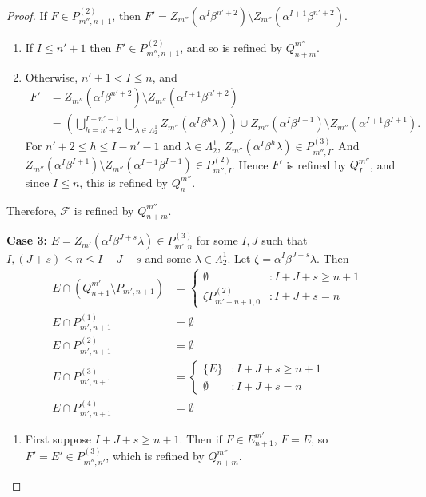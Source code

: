 \documentclass[12pt]{amsart}
\newcommand{\sm}{\setminus}
\newcommand{\mc}[1]{\mathcal{#1}}
\newcommand{\emp}{\emptyset}
\newcommand{\al}{\alpha}
\newcommand{\be}{\beta}
\newcommand{\ze}{\zeta}
\newcommand{\la}{\lambda}
\newcommand{\La}{\Lambda}
\theoremstyle{plain} %
\theoremstyle{definition} %
\begin{document}
\begin{proof}
    If $F \in P^{(2)}_{m'',n+1}$, then $F' = Z_{m''}(\al^I \be^{n'+2}) \sm Z_{m''}(\al^{I+1}\be^{n'+2}).$ 
    \begin{enumerate}
        \item If $I \le n'+1$ then $F' \in P^{(2)}_{m'',n+1}$, and so is refined by $Q_{n+m}^{m''}$.

        \item Otherwise, $n'+1 < I \leq n$, and
        \begin{align*}
            F' &= Z_{m''}(\al^I \be^{n'+2}) \sm Z_{m''}(\al^{I+1}\be^{n'+2})\\
            &= \left( \bigcup_{h=n'+2}^{I-n'-1} \bigcup_{\la \in \La_2^1} Z_{m''}(\al^{I}\be^h \la) \right) \cup Z_{m''}(\al^I \be^{I+1}) \sm Z_{m''}(\al^{I+1} \be^{I+1}).
        \end{align*}
        For $n'+2 \leq h \leq I-n' -1$ and $\la \in \La_2^1$, $Z_{m''}(\al^I\be^h \la) \in P_{m'',I}^{(3)}$. And $Z_{m''}(\al^I \be^{I+1}) \sm Z_{m''}(\al^{I+1} \be^{I+1}) \in P_{m'', I}^{(2)}$. Hence $F'$ is refined by $Q_I^{m''}$, and since $I \le n$, this is refined by $Q_n^{m''}$.
    \end{enumerate}
    Therefore, $\mc{F}$ is refined by $Q_{n+m}^{m''}$.


    \textbf{Case 3:} $E = Z_{m'}(\al^{I}\be^{J+s} \la) \in P_{m',n}^{(3)}$ for some $I, J$ such that $I, (J+s) \leq n \leq I+J+s$ and some $\la \in \La_2^1$. Let $\ze=\al^I \be^{J+s} \la$. Then
    \begin{align*}
        E \cap (Q^{m'}_{n+1} \sm P_{m', n+1}) &= \begin{cases}
            \emp &: I+J+s \geq n+1\\
            \ze P_{m'+n+1,0}^{(2)} &: I+J+s = n
        \end{cases}\\
        E \cap P^{(1)}_{m',n+1} &= \emp\\
        E \cap P^{(2)}_{m',n+1} &= \emp\\
        E \cap P^{(3)}_{m',n+1} &= \begin{cases}
            \{E\} &: I+J+s \geq n+1\\ \emp &: I+J+s = n
        \end{cases}\\
        E \cap P^{(4)}_{m',n+1} &= \emp
    \end{align*}
    \begin{enumerate}
        \item First suppose $I+J+s \ge n+1$. Then if $F \in E_{n+1}^{m'}$, $F = E$, so $F' = E' \in P^{(3)}_{m'',n'}$, which is refined by $Q_{n+m}^{m''}$.


\end{enumerate}
\end{proof}
\end{document}
